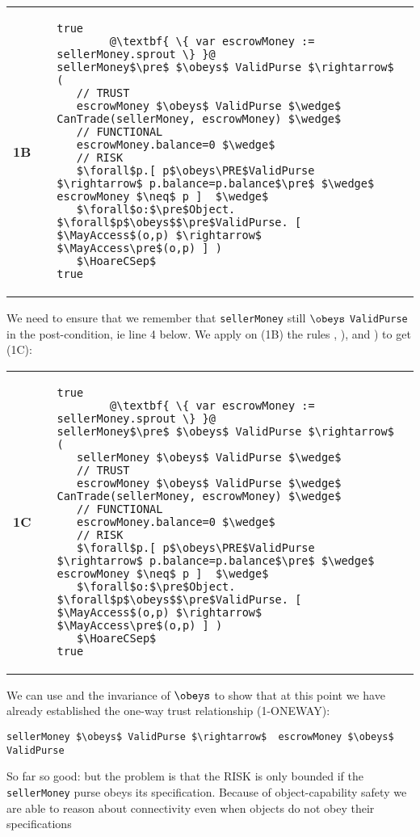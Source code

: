 \begin{tabular}{lll}
{\bf 1B} & & \begin{lstlisting}[escapechar=@]
true
        @\textbf{ \{ var escrowMoney := sellerMoney.sprout \} }@
sellerMoney$\pre$ $\obeys$ ValidPurse $\rightarrow$ (
   // TRUST
   escrowMoney $\obeys$ ValidPurse $\wedge$ CanTrade(sellerMoney, escrowMoney) $\wedge$
   // FUNCTIONAL
   escrowMoney.balance=0 $\wedge$
   // RISK
   $\forall$p.[ p$\obeys\PRE$ValidPurse $\rightarrow$ p.balance=p.balance$\pre$ $\wedge$ escrowMoney $\neq$ p ]  $\wedge$
   $\forall$o:$\pre$Object. $\forall$p$\obeys$$\pre$ValidPurse. [ $\MayAccess$(o,p) $\rightarrow$ $\MayAccess\pre$(o,p) ] )
   $\HoareCSep$
true
\end{lstlisting}
\end{tabular}


We need to ensure that we remember that \lstinline+sellerMoney+ still $\obeys$
\texttt{ValidPurse} in the post-condition, ie line 4 below. We apply on (1B) the rules
, ), and ) to get (1C):

\begin{tabular}{lll}
{\bf 1C} & &
\begin{lstlisting}[escapechar=@]
true
        @\textbf{ \{ var escrowMoney := sellerMoney.sprout \} }@
sellerMoney$\pre$ $\obeys$ ValidPurse $\rightarrow$ (
   sellerMoney $\obeys$ ValidPurse $\wedge$
   // TRUST
   escrowMoney $\obeys$ ValidPurse $\wedge$ CanTrade(sellerMoney, escrowMoney) $\wedge$
   // FUNCTIONAL
   escrowMoney.balance=0 $\wedge$
   // RISK
   $\forall$p.[ p$\obeys\PRE$ValidPurse $\rightarrow$ p.balance=p.balance$\pre$ $\wedge$ escrowMoney $\neq$ p ]  $\wedge$
   $\forall$o:$\pre$Object. $\forall$p$\obeys$$\pre$ValidPurse. [ $\MayAccess$(o,p) $\rightarrow$ $\MayAccess\pre$(o,p) ] )
   $\HoareCSep$
true
\end{lstlisting}
\end{tabular}

\noindent
We can use  and the invariance of $\obeys$ to show
that at this point we have already established the one-way trust
relationship (1-ONEWAY):

\begin{lstlisting}[backgroundcolor=\color{yellow}]
sellerMoney $\obeys$ ValidPurse $\rightarrow$  escrowMoney $\obeys$ ValidPurse
\end{lstlisting}

So far so good: but the problem is that the RISK is only bounded if
the \lstinline+sellerMoney+ purse obeys its specification.   Because
of object-capability safety we are able to reason about connectivity even when
objects do not obey their specifications

